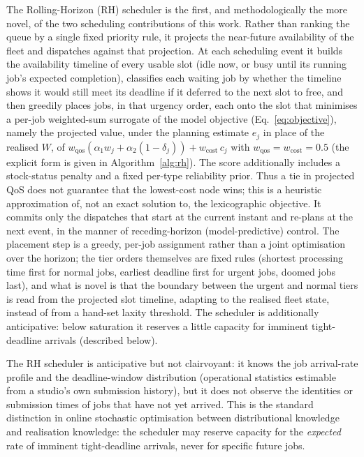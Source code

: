 The Rolling-Horizon (RH) scheduler is the first, and methodologically the more novel, of the two scheduling contributions of this work. Rather than ranking the queue by a single fixed priority rule, it projects the near-future availability of the fleet and dispatches against that projection. At each scheduling event it builds the availability timeline of every usable slot (idle now, or busy until its running job's expected completion), classifies each waiting job by whether the timeline shows it would still meet its deadline if it deferred to the next slot to free, and then greedily places jobs, in that urgency order, each onto the slot that minimises a per-job weighted-sum surrogate of the model objective (Eq.~\ref{eq:objective}), namely the projected value, under the planning estimate $e_j$ in place of the realised $W$, of $w_{\text{qos}}(\alpha_1 w_j + \alpha_2 (1-\delta_j)) + w_{\text{cost}}\,c_j$ with $w_{\text{qos}}=w_{\text{cost}}=0.5$ (the explicit form is given in Algorithm~\ref{alg:rh}). The score additionally includes a stock-status penalty and a fixed per-type reliability prior. Thus a tie in projected QoS does not guarantee that the lowest-cost node wins; this is a heuristic approximation of, not an exact solution to, the lexicographic objective. It commits only the dispatches that start at the current instant and re-plans at the next event, in the manner of receding-horizon (model-predictive) control. The placement step is a greedy, per-job assignment rather than a joint optimisation over the horizon; the tier orders themselves are fixed rules (shortest processing time first for normal jobs, earliest deadline first for urgent jobs, doomed jobs last), and what is novel is that the boundary between the urgent and normal tiers is read from the projected slot timeline, adapting to the realised fleet state, instead of from a hand-set laxity threshold. The scheduler is additionally anticipative: below saturation it reserves a little capacity for imminent tight-deadline arrivals (described below).

The RH scheduler is anticipative but not clairvoyant: it knows the job arrival-rate profile and the deadline-window distribution (operational statistics estimable from a studio's own submission history), but it does not observe the identities or submission times of jobs that have not yet arrived. This is the standard distinction in online stochastic optimisation between distributional knowledge and realisation knowledge: the scheduler may reserve capacity for the \emph{expected} rate of imminent tight-deadline arrivals, never for specific future jobs.

